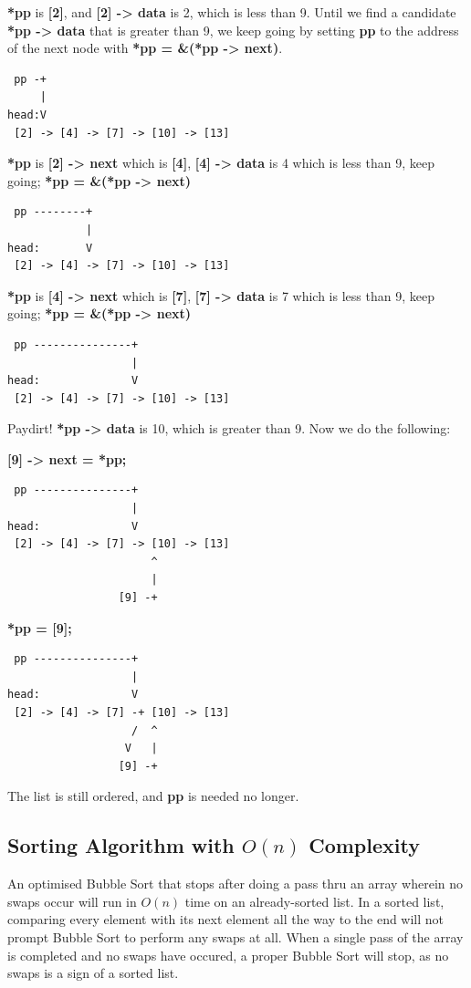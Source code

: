 \documentclass[12pt]{article}
\begin{document}
	\textbf{*pp} is \textbf{[2]}, and \textbf{[2] -> data} is 2, which is less than 9. Until we find a candidate \textbf{*pp -> data} that is greater than 9, we keep going by setting \textbf{pp} to the address of the next node with \textbf{*pp = \&(*pp -> next)}.

	\begin{lstlisting}
 pp -+
     |
head:V
 [2] -> [4] -> [7] -> [10] -> [13]
	\end{lstlisting}

	\textbf{*pp} is \textbf{[2] -> next} which is \textbf{[4]}, \textbf{[4] -> data} is 4 which is less than 9, keep going; \textbf{*pp = \&(*pp -> next)}

	\begin{lstlisting}
 pp --------+
            |
head:       V
 [2] -> [4] -> [7] -> [10] -> [13]
	\end{lstlisting}

	\textbf{*pp} is \textbf{[4] -> next} which is \textbf{[7]}, \textbf{[7] -> data} is 7 which is less than 9, keep going; \textbf{*pp = \&(*pp -> next)}

	\begin{lstlisting}
 pp ---------------+
                   |
head:              V
 [2] -> [4] -> [7] -> [10] -> [13]
	\end{lstlisting}

	Paydirt! \textbf{*pp -> data} is 10, which is greater than 9. Now we do the following: \linebreak

	\textbf{[9] -> next = *pp;}

	\begin{lstlisting}
 pp ---------------+
                   |
head:              V
 [2] -> [4] -> [7] -> [10] -> [13]
                      ^
                      |
                 [9] -+
\end{lstlisting}

	\textbf{*pp = [9];}

	\begin{lstlisting}
 pp ---------------+
                   |
head:              V
 [2] -> [4] -> [7] -+ [10] -> [13]
                   /  ^
                  V   |
                 [9] -+
\end{lstlisting}

	The list is still ordered, and \textbf{pp} is needed no longer.

	\subsection{Sorting Algorithm with $O(n)$ Complexity}
	An optimised Bubble Sort that stops after doing a pass thru an array wherein no swaps occur will run in $O(n)$ time on an already-sorted list. In a sorted list, comparing every element with its next element all the way to the end will not prompt Bubble Sort to perform any swaps at all. When a single pass of the array is completed and no swaps have occured, a proper Bubble Sort will stop, as no swaps is a sign of a sorted list.
\end{document}
